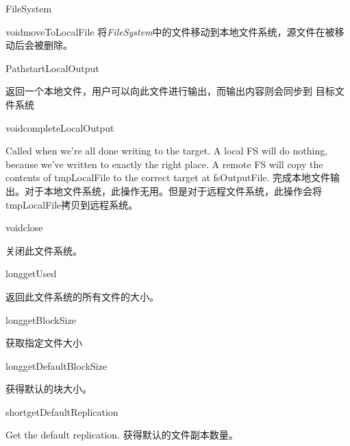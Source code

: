 \begin{XeClass}{FileSystem}
\begin{XeMethod}{\XePublic}{void}{moveToLocalFile}
 将\emph{FileSystem}中的文件移动到本地文件系统，源文件在被移动后会被删除。

    \end{XeMethod}

    \begin{XeMethod}{\XePublic}{Path}{startLocalOutput}
         
 返回一个本地文件，用户可以向此文件进行输出，而输出内容则会同步到
 目标文件系统

    \end{XeMethod}

    \begin{XeMethod}{\XePublic}{void}{completeLocalOutput}
         
 Called when we're all done writing to the target.  A local FS will
 do nothing, because we've written to exactly the right place.  A remote
 FS will copy the contents of tmpLocalFile to the correct target at
 fsOutputFile.
 完成本地文件输出。对于本地文件系统，此操作无用。但是对于远程文件系统，此操作会将
 tmpLocalFile拷贝到远程系统。

    \end{XeMethod}

    \begin{XeMethod}{\XePublic}{void}{close}
         
 关闭此文件系统。

    \end{XeMethod}

    \begin{XeMethod}{\XePublic}{long}{getUsed}
         
 返回此文件系统的所有文件的大小。

    \end{XeMethod}

    \begin{XeMethod}{\XePublic}{long}{getBlockSize}
         
 获取指定文件大小

    \end{XeMethod}

    \begin{XeMethod}{\XePublic}{long}{getDefaultBlockSize}
         
 获得默认的块大小。

    \end{XeMethod}

    \begin{XeMethod}{\XePublic}{short}{getDefaultReplication}
         
 Get the default replication.
 获得默认的文件副本数量。


\end{XeMethod}
\end{XeClass}
